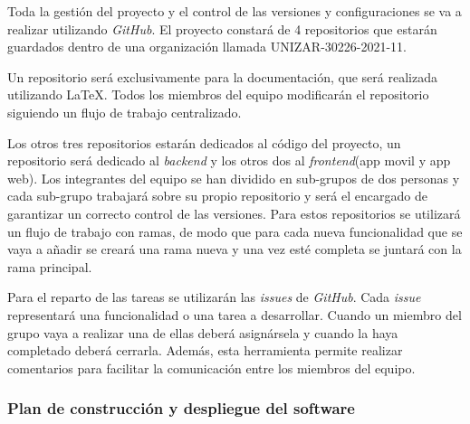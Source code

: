 \documentclass{article}
\begin{document}


Toda la gestión del proyecto y el control de las versiones y configuraciones se va a realizar utilizando \textit{GitHub}. El proyecto constará de 4 repositorios que estarán guardados dentro de una organización llamada UNIZAR-30226-2021-11.

Un repositorio será exclusivamente para la documentación, que será realizada utilizando \LaTeX. Todos los miembros del equipo modificarán el repositorio siguiendo un flujo de trabajo centralizado.

Los otros tres repositorios estarán dedicados al código del proyecto, un repositorio será dedicado al \textit{backend} y los otros dos al \textit{frontend}(app movil y app web). Los integrantes del equipo se han dividido en sub-grupos de dos personas y cada sub-grupo trabajará sobre su propio repositorio y será el encargado de garantizar un correcto control de las versiones. Para estos repositorios se utilizará un flujo de trabajo con ramas, de modo que para cada nueva funcionalidad que se vaya a añadir se creará una rama nueva y una vez esté completa se juntará con la rama principal.

Para el reparto de las tareas se utilizarán las \textit{issues} de \textit{GitHub}. Cada \textit{issue} representará una funcionalidad o una tarea a desarrollar. Cuando un miembro del grupo vaya a realizar una de ellas deberá asignársela y cuando la haya completado deberá cerrarla. Además, esta herramienta permite realizar comentarios para facilitar la comunicación entre los miembros del equipo.

\subsubsection{Plan de construcción y despliegue del software}
\end{document}
